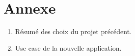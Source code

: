 \documentclass{article}
\begin{document}
\newpage
\section{Annexe}
\begin{enumerate}
  \item Résumé des choix du projet précédent.
  \item Use case de la nouvelle application.
\end{enumerate}

\newpage
\begingroup
  \renewcommand{\section}[2]{\Large\textbf{Références}\normalsize}
  
  
  \nocite{*}
\endgroup
\end{document}
